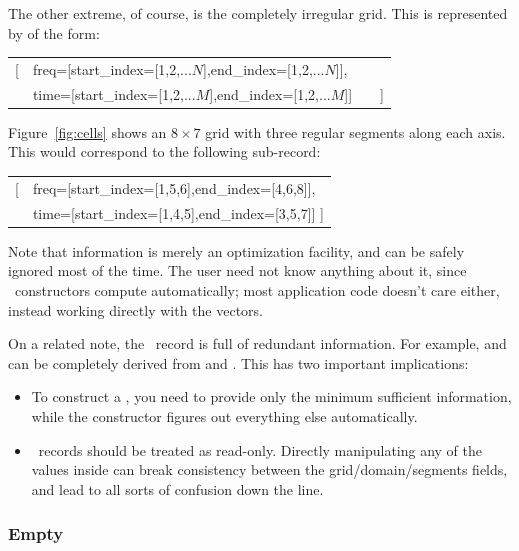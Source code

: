   The other extreme, of course, is the completely irregular grid. This is
  represented by  of the form:

  {\tt\begin{center}\begin{tabular}{ll}
  [&freq=[start\_index=[1,2,$...N$],end\_index=[1,2,$...N$]],\\
  &time=[start\_index=[1,2,$...M$],end\_index=[1,2,$...M$]]~~~~]
  \end{tabular}\end{center}}
  
  Figure~\ref{fig:cells} shows an $8\times7$ grid with three regular segments
  along each axis. This would correspond to the following 
  sub-record:

  {\tt\begin{center}\begin{tabular}{ll}
  [&freq=[start\_index=[1,5,6],end\_index=[4,6,8]],\\
   &time=[start\_index=[1,4,5],end\_index=[3,5,7]] ]
  \end{tabular}\end{center}}
  
  Note that  information is merely an optimization facility, and
  can be safely ignored most of the time. The user need not know anything about
  it, since \Cells\ constructors compute  automatically; most
  application code doesn't care either, instead working directly with the
   vectors. 

  On a related note, the \Cells\ record is full of redundant information. For
  example,  and  can be completely derived from
   and . This has two important implications:
  
  \begin{itemize}
  
  \item To construct a \Cells, you need to provide only the minimum sufficient
  information, while the constructor figures out everything else automatically.

  \item \Cells\ records should be treated as read-only. Directly manipulating 
  any of the values inside can break consistency between the
  grid/domain/segments fields, and lead to all sorts of confusion down
  the line.

  \end{itemize}

\subsubsection{Empty \Cells}

